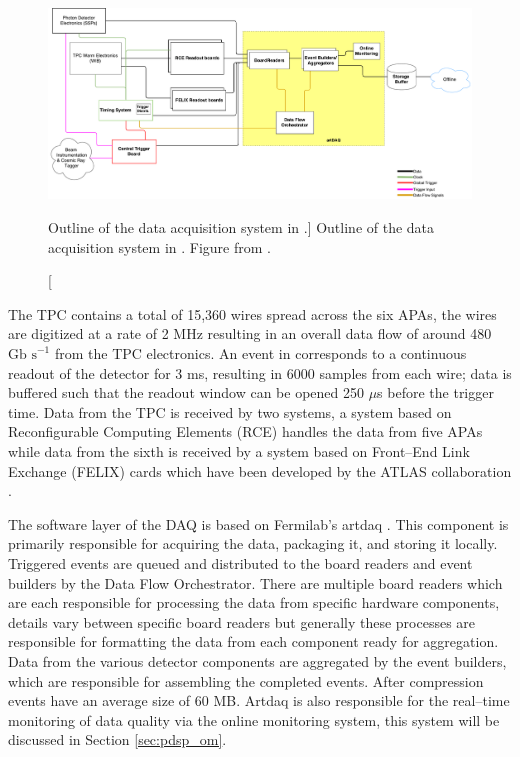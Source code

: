 \begin{figure}

	\centering

	\includegraphics[width=\textwidth]{figures/pdsp_daq.pdf}

	\caption
	[Outline of the data acquisition system in \protodune{}.]
	{Outline of the data acquisition system in \protodune{}. Figure from
	\cite{Abi2017}.}

	\label{fig:pdsp_daq}

\end{figure}

The \protodune{} TPC contains a total of 15,360 wires spread across the six
APAs, the wires are digitized at a rate of 2 MHz resulting in an overall data
flow of around 480 $\mbox{Gb s}^{-1}$ from the TPC electronics. An event in
\protudune{} corresponds to a continuous readout of the detector for 3 ms,
resulting in 6000 samples from each wire; data is buffered such that the readout
window can be opened 250 $\mu$s before the trigger time. Data from the TPC is
received by two systems, a system based on Reconfigurable Computing Elements
(RCE) \cite{7431254} handles the data from five APAs while data from the sixth 
is received by a system based on Front--End Link Exchange (FELIX) cards which 
have been developed by the ATLAS collaboration \cite{Anderson_2016}.

The software layer of the \protodune{} DAQ is based on Fermilab's artdaq 
\cite{6495515}. This component is primarily responsible for acquiring the data,
packaging it, and storing it locally. Triggered events are queued and 
distributed to the board readers and event builders by the Data Flow 
Orchestrator. There are multiple board readers which are each responsible for 
processing the data from specific hardware components, details vary between 
specific board readers but generally these processes are responsible for 
formatting the data from each component ready for aggregation. Data from the
various detector components are aggregated by the event builders, which are
responsible for assembling the completed events. After compression events have
an average size of 60 MB. Artdaq is also responsible for the real--time 
monitoring of data quality via the online monitoring system, this system will be
discussed in Section \ref{sec:pdsp_om}.

